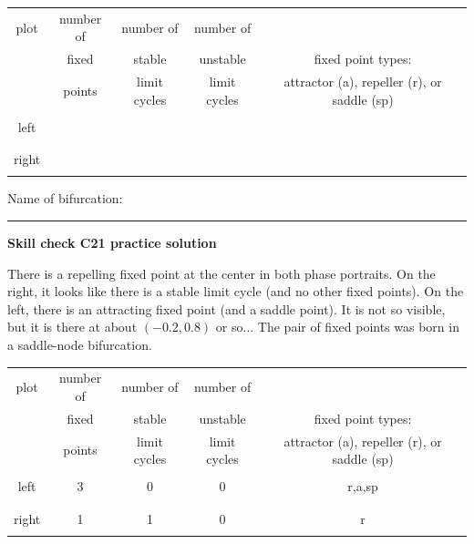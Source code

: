 \documentclass[12pt,letterpaper,noanswers]{exam}
\begin{document}
\begin{questions}
\begin{tabular}{| c | c | c | c | c |}
\hline
plot & number of & number of  & number of  & \hspace{3in} \\
& fixed & stable & unstable &fixed point types:   \\
&  points  & limit cycles & limit cycles & attractor (a), repeller (r), or saddle (sp) \\
\hline
& & & &\\
left& & & & \\
& & & &\\
\hline
& & & &\\
right& & & & \\
& & & &\\
\hline
\end{tabular}

Name of bifurcation:

\end{questions}

\vspace{0.2cm}

\hrule
\vspace{0.2cm}

\noindent\textbf{Skill check C21 practice solution}

There is a repelling fixed point at the center in both phase portraits.  On the right, it looks like there is a stable limit cycle (and no other fixed points).  On the left, there is an attracting fixed point (and a saddle point).  It is not so visible, but it is there at about $(-0.2, 0.8)$ or so...  The pair of fixed points was born in a saddle-node bifurcation.

\begin{tabular}{| c | c | c | c | c |}
\hline
plot & number of & number of  & number of  & \hspace{3in} \\
& fixed & stable & unstable &fixed point types:   \\
&  points  & limit cycles & limit cycles & attractor (a), repeller (r), or saddle (sp) \\
\hline
& & & &\\
left & 3 & 0 & 0  & r,a,sp \\
& & & &\\
\hline
& & & &\\
right& 1 & 1 & 0 & r \\
& & & &\\
\hline
\end{tabular}
\end{document}
